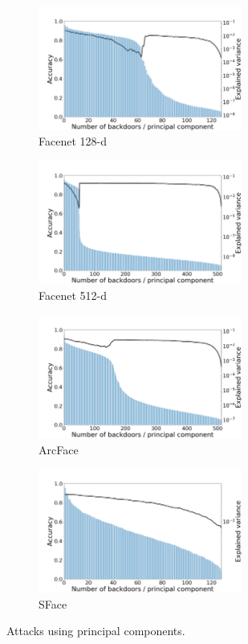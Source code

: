 \documentclass{article}
\theoremstyle{plain}
\theoremstyle{definition}
\theoremstyle{remark}
\begin{document}
\begin{figure}[t!]
    \centering
    \begin{subfigure}[t]{0.45\textwidth}
        \centering
        \includegraphics[height=1.6in]{figures/pca_pca_attack_combo_Facenet_opencv_cosine_0.png}
        \caption{Facenet 128-d}
    \end{subfigure}%
    \hfill 
    \begin{subfigure}[t]{0.45\textwidth}
        \centering
        \includegraphics[height=1.6in]{figures/pca_pca_attack_combo_Facenet512_opencv_cosine_0.png}
        \caption{Facenet 512-d}
    \end{subfigure}
    \hfill 
    \begin{subfigure}[t]{0.45\textwidth}
        \centering
        \includegraphics[height=1.6in]{figures/pca_pca_attack_combo_ArcFace_opencv_cosine_0.png}
        \caption{ArcFace}
    \end{subfigure}
    \hfill 
    \begin{subfigure}[t]{0.45\linewidth}
        \centering
        \includegraphics[height=1.6in]{figures/pca_pca_attack_combo_SFace_opencv_cosine_0.png}
        \caption{SFace}
    \end{subfigure}
    \caption{Attacks using principal components.}
\end{figure}
\end{document}
